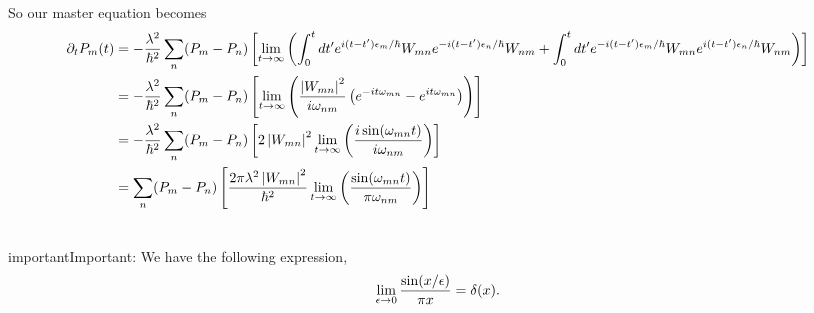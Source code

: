 \documentclass[letterpaper,10pt,english]{sphinxmanual}
\begin{document}
So our master equation becomes
\begin{gather}
\begin{split}\partial_t P_m(t) &= -\frac{\lambda^2}{\hbar ^2} \sum_n(P_m - P_n) \left[ \lim_{t\rightarrow \infty} \left( \int_0^t dt' e^{i(t-t')\epsilon_m/\hbar} W_{mn} e^{-i(t-t')\epsilon_n/\hbar} W_{nm} + \int_0^t dt' e^{-i(t-t')\epsilon_m/\hbar} W_{mn} e^{i(t-t')\epsilon_n/\hbar} W_{nm} \right) \right] \\
& = -\frac{\lambda^2}{\hbar^2} \sum_n (P_m - P_n) \left[ \lim_{t\rightarrow \infty} \left( \frac{\left| W_{mn}\right|^2 }{i\omega_{nm}} \left( e^{-it\omega_{mn}}  - e^{it\omega_{mn}}  \right) \right)   \right] \\
& = -\frac{\lambda^2}{\hbar^2} \sum_n (P_m - P_n) \left[ 2\left| W_{mn}\right|^2  \lim_{t\rightarrow \infty}   \left( \frac{i\sin(\omega_{mn}t)}{i\omega_{nm}}   \right)   \right] \\
& =  \sum_n (P_m - P_n) \left[  \frac{2 \pi \lambda^2 \left| W_{mn}\right|^2 }{\hbar^2}  \lim_{t\rightarrow \infty}   \left( \frac{\sin(\omega_{mn}t)}{\pi\omega_{nm}}   \right)   \right]\end{split}\notag\\\begin{split}\end{split}\notag
\end{gather}
\begin{notice}{important}{Important:}
We have the following expression,
\begin{gather}
\begin{split}\lim_{\epsilon\rightarrow 0} \frac{\sin(x/\epsilon)}{\pi x} = \delta(x) .\end{split}\notag\\\begin{split}\end{split}\notag
\end{gather}\end{notice}
\end{document}
